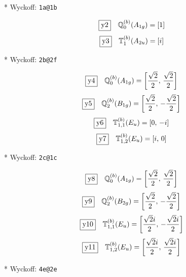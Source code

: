 \documentclass[fleqn,10pt,landscape]{jsarticle}
\begin{document}
\vspace{5mm}

\noindent ** Wyckoff: \texttt{1a@1b}

\begin{dmath*}
\fbox{y2}\quad \mathbb{Q}_{0}^{(b)}(A_{1g})=\left[ 1 \right]
\end{dmath*}
\begin{dmath*}
\fbox{y3}\quad \mathbb{T}_{1}^{(b)}(A_{2u})=\left[ i \right]
\end{dmath*}
\vspace{5mm}

\noindent ** Wyckoff: \texttt{2b@2f}

\begin{dmath*}
\fbox{y4}\quad \mathbb{Q}_{0}^{(b)}(A_{1g})=\left[ \frac{\sqrt{2}}{2},\, \frac{\sqrt{2}}{2} \right]
\end{dmath*}
\begin{dmath*}
\fbox{y5}\quad \mathbb{Q}_{2}^{(b)}(B_{1g})=\left[ \frac{\sqrt{2}}{2},\, - \frac{\sqrt{2}}{2} \right]
\end{dmath*}
\begin{dmath*}
\fbox{y6}\quad \mathbb{T}_{1,1}^{(b)}(E_{u})=\left[ 0,\, - i \right]
\end{dmath*}
\begin{dmath*}
\fbox{y7}\quad \mathbb{T}_{1,2}^{(b)}(E_{u})=\left[ i,\, 0 \right]
\end{dmath*}
\vspace{5mm}

\noindent ** Wyckoff: \texttt{2c@1c}

\begin{dmath*}
\fbox{y8}\quad \mathbb{Q}_{0}^{(b)}(A_{1g})=\left[ \frac{\sqrt{2}}{2},\, \frac{\sqrt{2}}{2} \right]
\end{dmath*}
\begin{dmath*}
\fbox{y9}\quad \mathbb{Q}_{2}^{(b)}(B_{2g})=\left[ \frac{\sqrt{2}}{2},\, - \frac{\sqrt{2}}{2} \right]
\end{dmath*}
\begin{dmath*}
\fbox{y10}\quad \mathbb{T}_{1,1}^{(b)}(E_{u})=\left[ \frac{\sqrt{2} i}{2},\, - \frac{\sqrt{2} i}{2} \right]
\end{dmath*}
\begin{dmath*}
\fbox{y11}\quad \mathbb{T}_{1,2}^{(b)}(E_{u})=\left[ \frac{\sqrt{2} i}{2},\, \frac{\sqrt{2} i}{2} \right]
\end{dmath*}
\vspace{5mm}

\noindent ** Wyckoff: \texttt{4e@2e}
\end{document}
